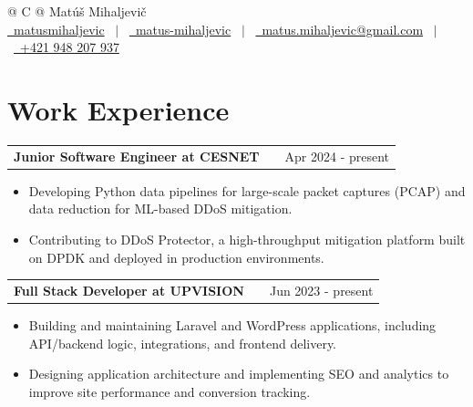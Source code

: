 \documentclass[a4paper,12pt]{article}
\makeatletter
\newenvironment{joblong}[2]
    {
    \begin{tabularx}{\linewidth}{@{}l X r@{}}
    \textbf{#1} & \hfill &  #2 \\[3.75pt]
    \end{tabularx}
    \begin{minipage}[t]{\linewidth}
    \begin{itemize}[nosep,after=\strut, leftmargin=1em, itemsep=3pt,label=--]
    }
    {
    \end{itemize}
    \end{minipage}    
    }
\makeatother
\begin{document}
\pagestyle{empty} 



\begin{tabularx}{\linewidth}{@{} C @{}}
\Huge{Matúš Mihaljevič} \\[7.5pt]
\href{https://github.com/matusmihaljevic}{\raisebox{-0.05\height}\faGithub\ matusmihaljevic} \ $|$ \ 
\href{https://www.linkedin.com/in/matus-mihaljevic}{\raisebox{-0.05\height}\faLinkedin\ matus-mihaljevic} \ $|$ \ 
\href{mailto:matus.mihaljevic@gmail.com}{\raisebox{-0.05\height}\faEnvelope \ matus.mihaljevic@gmail.com} \ $|$ \ 
\href{tel:+421948207937}{\raisebox{-0.05\height}\faMobile \ +421 948 207 937} \\
\end{tabularx}


\section{Work Experience}

\begin{joblong}{Junior Software Engineer at CESNET}{Apr 2024 - present}
    \item Developing Python data pipelines for large-scale packet captures (PCAP) and data reduction for ML-based DDoS mitigation.
    \item Contributing to DDoS Protector, a high-throughput mitigation platform built on DPDK and deployed in production environments.
\end{joblong}

\begin{joblong}{Full Stack Developer at UPVISION}{Jun 2023 - present}
    \item Building and maintaining Laravel and WordPress applications, including API/backend logic, integrations, and frontend delivery.
    \item Designing application architecture and implementing SEO and analytics to improve site performance and conversion tracking.
\end{joblong}
\end{document}
